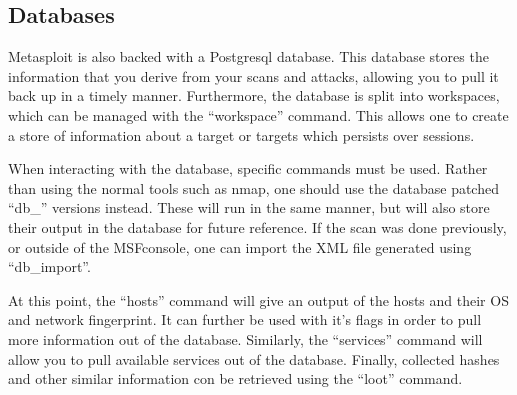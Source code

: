 			\subsection{Databases}
				Metasploit is also backed with a Postgresql database. 
				This database stores the information that you derive from your scans and attacks, allowing you to pull it back up in a timely manner. 
				Furthermore, the database is split into workspaces, which can be managed with the ``workspace'' command. 
				This allows one to create a store of information about a target or targets which persists over sessions. 

				When interacting with the database, specific commands must be used. 
				Rather than using the normal tools such as nmap, one should use the database patched ``db\_'' versions instead. 
				These will run in the same manner, but will also store their output in the database for future reference. 
				If the scan was done previously, or outside of the MSFconsole, one can import the XML file generated using ``db\_import''. 

				At this point, the ``hosts'' command will give an output of the hosts and their OS and network fingerprint. 
				It can further be used with it's flags in order to pull more information out of the database. 
				Similarly, the ``services'' command will allow you to pull available services out of the database. 
				Finally, collected hashes and other similar information con be retrieved using the ``loot'' command. 
	
